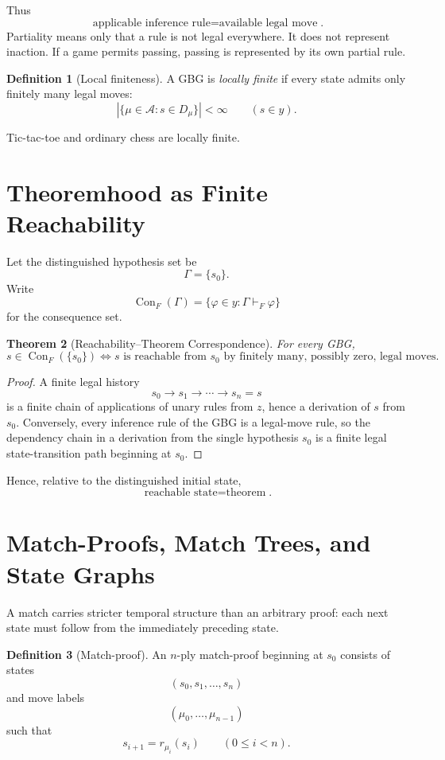 \documentclass[11pt]{article}
\newtheorem{theorem}{Theorem}[section]
\theoremstyle{definition}
\newtheorem{definition}[theorem]{Definition}
\theoremstyle{remark}
\newcommand{\Con}{\operatorname{Con}}
\begin{document}
Thus
\[
\boxed{\text{applicable inference rule}=\text{available legal move}}.
\]
Partiality means only that a rule is not legal everywhere. It does not represent inaction. If a game permits passing, passing is represented by its own partial rule.

\begin{definition}[Local finiteness]
A GBG is \emph{locally finite} if every state admits only finitely many legal moves:
\[
|\{\mu\in\mathcal A:s\in D_\mu\}|<\infty
\qquad(s\in y).
\]
\end{definition}

Tic-tac-toe and ordinary chess are locally finite.

\section{Theoremhood as Finite Reachability}

Let the distinguished hypothesis set be
\[
\Gamma=\{s_0\}.
\]
Write
\[
\Con_F(\Gamma)=\{\varphi\in y:\Gamma\vdash_F\varphi\}
\]
for the consequence set.

\begin{theorem}[Reachability--Theorem Correspondence]
For every GBG,
\[
\boxed{
s\in\Con_F(\{s_0\})
\iff
s\text{ is reachable from }s_0\text{ by finitely many, possibly zero, legal moves}.
}
\]
\end{theorem}

\begin{proof}
A finite legal history
\[
s_0\to s_1\to\cdots\to s_n=s
\]
is a finite chain of applications of unary rules from $z$, hence a derivation of $s$ from $s_0$. Conversely, every inference rule of the GBG is a legal-move rule, so the dependency chain in a derivation from the single hypothesis $s_0$ is a finite legal state-transition path beginning at $s_0$.
\end{proof}

Hence, relative to the distinguished initial state,
\[
\boxed{\text{reachable state}=\text{theorem}}.
\]

\section{Match-Proofs, Match Trees, and State Graphs}

A match carries stricter temporal structure than an arbitrary proof: each next state must follow from the immediately preceding state.

\begin{definition}[Match-proof]
An $n$-ply match-proof beginning at $s_0$ consists of states
\[
(s_0,s_1,\ldots,s_n)
\]
and move labels
\[
(\mu_0,\ldots,\mu_{n-1})
\]
such that
\[
s_{i+1}=r_{\mu_i}(s_i)
\qquad(0\le i<n).
\]
\end{definition}
\end{document}
